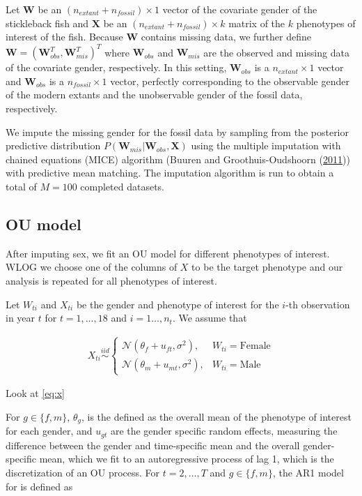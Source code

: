 \documentclass[
  12pt,
]{article}
\begin{document}
Let \(\boldsymbol{W}\) be an \((n_{extant} + n_{fossil}) \times 1\)
vector of the covariate gender of the stickleback fish and
\(\boldsymbol{X}\) be an \((n_{extant} + n_{fossil}) \times k\) matrix
of the \(k\) phenotypes of interest of the fish. Because
\(\boldsymbol{W}\) contains missing data, we further define
\(\boldsymbol{W} = (\boldsymbol{W}_{obs}^T,\boldsymbol{W}_{mis}^T)^T\)
where \(\boldsymbol{W}_{obs}\) and \(\boldsymbol{W}_{mis}\) are the
observed and missing data of the covariate gender, respectively. In this
setting, \(\boldsymbol{W}_{obs}\) is a \(n_{extant} \times 1\) vector
and \(\boldsymbol{W}_{obs}\) is a \(n_{fossil} \times 1\) vector,
perfectly corresponding to the observable gender of the modern extants
and the unobservable gender of the fossil data, respectively.

We impute the missing gender for the fossil data by sampling from the
posterior predictive distribution
\(P(\boldsymbol{W}_{mis}|\boldsymbol{W}_{obs}, \boldsymbol{X})\) using
the multiple imputation with chained equations (MICE) algorithm (Buuren
and Groothuis-Oudshoorn (\protect\hyperlink{ref-MICE}{2011})) with
predictive mean matching. The imputation algorithm is run to obtain a
total of \(M = 100\) completed datasets.

\hypertarget{ou-model}{%
\subsection{OU model}\label{ou-model}}

After imputing sex, we fit an OU model for different phenotypes of
interest. WLOG we choose one of the columns of \(X\) to be the target
phenotype and our analysis is repeated for all phenotypes of interest.

Let \(W_{ti}\) and \(X_{ti}\) be the gender and phenotype of interest
for the \(i\)-th observation in year \(t\) for \(t = 1, \ldots, 18\) and
\(i = 1\ldots,n_{t}\). We assume that

\begin{align}
X_{ti} \overset{iid}{\sim}\left\{\begin{array}{ll} \mathcal{N}(\theta_f + u_{ft},\sigma^2), & W_{ti} = \text{Female} \\ \mathcal{N}(\theta_m + u_{mt},\sigma^2), & W_{ti} = \text{Male} \end{array}\right.
\label{eq:x}
\end{align}

Look at \ref{eq:x}

For \(g \in \{f,m\}\), \(\theta_g\), is the defined as the overall mean
of the phenotype of interest for each gender, and \(u_{gt}\) are the
gender specific random effects, measuring the difference between the
gender and time-specific mean and the overall gender-specific mean,
which we fit to an autoregressive process of lag 1, which is the
discretization of an OU process. For \(t = 2,\ldots,T\) and
\(g \in \{f,m\}\), the AR1 model for is defined as
\end{document}
